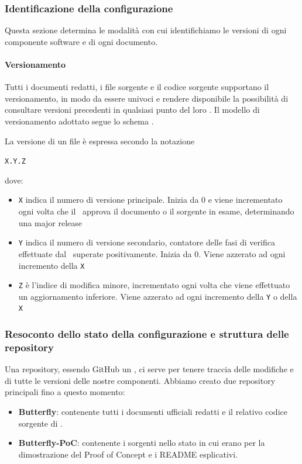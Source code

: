 		\subsubsection{Identificazione della configurazione} \label{IdentificazioneConfigurazione}
		Questa sezione determina le modalità con cui identifichiamo le versioni di ogni componente software e di ogni documento.

		\paragraph{Versionamento} \label{Versionamento}
		Tutti i documenti redatti, i file sorgente e il codice sorgente supportano il versionamento, in modo da essere univoci e rendere disponibile la possibilità di consultare versioni precedenti in qualsiasi punto del loro .
		Il modello di versionamento adottato segue lo schema .\par
		La versione di un file è espressa secondo la notazione
			\begin{center}
			\texttt{X.Y.Z}
			\end{center}
			\indent dove:
			\begin{itemize}
				\item \texttt{X} indica il numero di versione principale. Inizia da 0 e viene incrementato ogni volta che il \Res\ approva il documento o il sorgente in esame,
					determinando una major release
				\item \texttt{Y} indica il numero di versione secondario, contatore delle fasi di verifica effettuate dal \Ver\ superate positivamente.
					Inizia da 0. Viene azzerato ad ogni incremento della \texttt{X}
				\item \texttt{Z} è l'indice di modifica minore, incrementato ogni volta che viene effettuato un aggiornamento inferiore.
				Viene azzerato ad ogni incremento della \texttt{Y} o della \texttt{X}
			\end{itemize}

		\subsubsection{Resoconto dello stato della configurazione e struttura delle repository} \label{ResocontoConfigurazione}
		Una repository, essendo GitHub un , ci serve per tenere traccia delle modifiche e di tutte le versioni delle nostre componenti.
		Abbiamo creato due repository principali fino a questo momento:
		\begin{itemize}
			\item \textbf{Butterfly}: contenente tutti i documenti ufficiali redatti e il relativo codice sorgente di \progetto.
			\item \textbf{Butterfly-PoC}: contenente i sorgenti nello stato in cui erano per la dimostrazione del Proof of Concept e i README esplicativi.
		\end{itemize}

